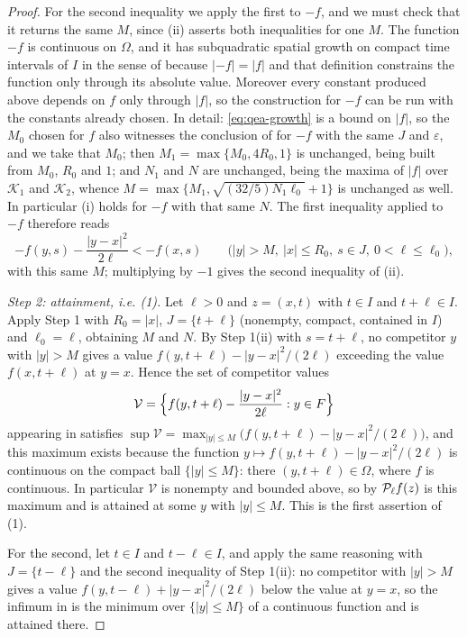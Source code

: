 \begin{proof}
For the second inequality we apply the first to $-f$, and we must check that it
returns the same $M$, since (ii) asserts both inequalities for one $M$. The
function $-f$ is continuous on $\Omega$, and it has subquadratic spatial growth
on compact time intervals of $I$ in the sense of 
because $|-f|=|f|$ and that definition constrains the function only through its
absolute value. Moreover every constant produced above depends on $f$ only
through $|f|$, so the construction for $-f$ can be run with the constants
already chosen. In detail: \eqref{eq:qea-growth} is a bound on $|f|$, so the
$M_0$ chosen for $f$ also witnesses the conclusion of
 for $-f$ with the same $J$ and $\varepsilon$, and
we take that $M_0$; then $M_1=\max\{M_0,4R_0,1\}$ is unchanged, being built from
$M_0$, $R_0$ and $1$; and $N_1$ and $N$ are unchanged, being the maxima of
$|f|$ over $\mathcal K_1$ and $\mathcal K_2$, whence
$M=\max\{M_1,\sqrt{(32/5)N_1\ell_0}+1\}$ is unchanged as well. In particular (i)
holds for $-f$ with that same $N$.
The first inequality applied to $-f$ therefore reads
\[
  -f(y,s)-\frac{|y-x|^2}{2\ell}<-f(x,s)
  \qquad\bigl(|y|>M,\ |x|\le R_0,\ s\in J,\ 0<\ell\le\ell_0\bigr),
\]
with this same $M$; multiplying by $-1$ gives the second inequality of (ii).

\emph{Step 2: attainment, i.e. (1).}
Let $\ell>0$ and $z=(x,t)$ with $t\in I$ and $t+\ell\in I$. Apply Step 1 with
$R_0=|x|$, $J=\{t+\ell\}$ (nonempty, compact, contained in $I$) and
$\ell_0=\ell$, obtaining $M$ and $N$. By Step 1(ii) with $s=t+\ell$, no
competitor $y$ with $|y|>M$ gives a value
$f(y,t+\ell)-|y-x|^2/(2\ell)$ exceeding the value $f(x,t+\ell)$ at $y=x$.
Hence the set of competitor values
\[
  \mathcal V=\Bigl\{f(y,t+\ell)-\frac{|y-x|^2}{2\ell}:y\in F\Bigr\}
\]
appearing in  satisfies
$\sup\mathcal V
 =\max_{|y|\le M}\bigl(f(y,t+\ell)-|y-x|^2/(2\ell)\bigr)$,
and this maximum exists because the function
$y\mapsto f(y,t+\ell)-|y-x|^2/(2\ell)$ is continuous on the compact ball
$\{|y|\le M\}$: there $(y,t+\ell)\in\Omega$, where $f$ is continuous. In
particular $\mathcal V$ is nonempty and bounded above, so by 
$\mathcal{P}_\ell f(z)$ is this maximum and is attained at some $y$ with $|y|\le M$.
This is the first assertion of (1).

For the second, let $t\in I$ and $t-\ell\in I$, and apply the same reasoning
with $J=\{t-\ell\}$ and the second inequality of Step 1(ii): no competitor with
$|y|>M$ gives a value $f(y,t-\ell)+|y-x|^2/(2\ell)$ below the value at $y=x$, so
the infimum in  is the minimum over $\{|y|\le M\}$ of a
continuous function and is attained there.


\end{proof}
